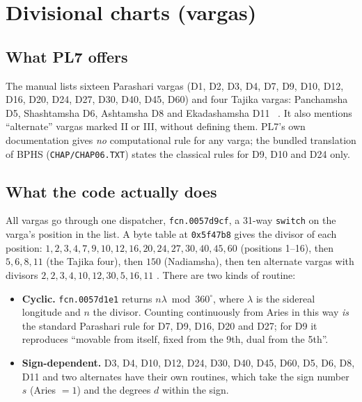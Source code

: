 \section{Divisional charts (vargas)}
\label{sec:vargas}

\subsection{What PL7 offers}

The manual lists sixteen Parashari vargas (D1, D2, D3, D4, D7, D9, D10, D12, D16, D20,
D24, D27, D30, D40, D45, D60) and four Tajika vargas: Panchamsha D5, Shashtamsha D6,
Ashtamsha D8 and Ekadashamsha D11 \tagDOC\ \parencite[pp.~40, 52--53]{geovision2006pl7}. It
also mentions ``alternate'' vargas marked II or III, without defining them. PL7's own
documentation gives \emph{no} computational rule for any varga; the bundled translation of
BPHS (\texttt{CHAP/CHAP06.TXT}) states the classical rules for D9, D10 and D24 only.

\subsection{What the code actually does}

All vargas go through one dispatcher, \texttt{fcn.0057d9cf}, a 31-way \texttt{switch} on
the varga's position in the list. A byte table at \texttt{0x5f47b8} gives the divisor of
each position: $1, 2, 3, 4, 7, 9, 10, 12, 16, 20, 24, 27, 30, 40, 45, 60$ (positions
1--16), then $5, 6, 8, 11$ (the Tajika four), then $150$ (Nadiamsha), then ten alternate
vargas with divisors $2, 2, 3, 4, 10, 12, 30, 5, 16, 11$ \tagBIN. There are two kinds of
routine:

\begin{itemize}[leftmargin=*]
  \item \textbf{Cyclic.} \texttt{fcn.0057d1e1} returns $n\lambda \bmod 360^\circ$, where
  $\lambda$ is the sidereal longitude and $n$ the divisor. Counting continuously from Aries
  in this way \emph{is} the standard Parashari rule for D7, D9, D16, D20 and D27; for D9 it
  reproduces ``movable from itself, fixed from the 9th, dual from the 5th''.
  \item \textbf{Sign-dependent.} D3, D4, D10, D12, D24, D30, D40, D45, D60, D5, D6, D8,
  D11 and two alternates have their own routines, which take the sign number $s$ (Aries
  $=1$) and the degrees $d$ within the sign.
\end{itemize}

